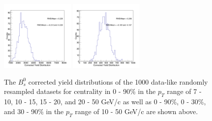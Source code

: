 \begin{figure}[h]
\begin{center}
\includegraphics[width= 0.32\textwidth]{Figures/Chapter5/BsCorrYield_0_30_10-50_Assym.png}
\includegraphics[width= 0.32\textwidth]{Figures/Chapter5/BsCorrYield_30_90_10-50_Assym.png}  
\caption{The $B^0_s$ corrected yield distributions of the 1000 data-like randomly resampled datasets for centrality in 0 - 90\% in the $p_T$ range of 7 - 10, 10 - 15, 15 - 20, and 20 - 50 GeV/c as well as 0 - 90\%, 0 - 30\%, and 30 - 90\% in the $p_T$ range of 10 - 50 GeV/c are shown above.} 
\label{BsCorrYieldBoot} 
\end{center}
\end{figure}
\clearpage

